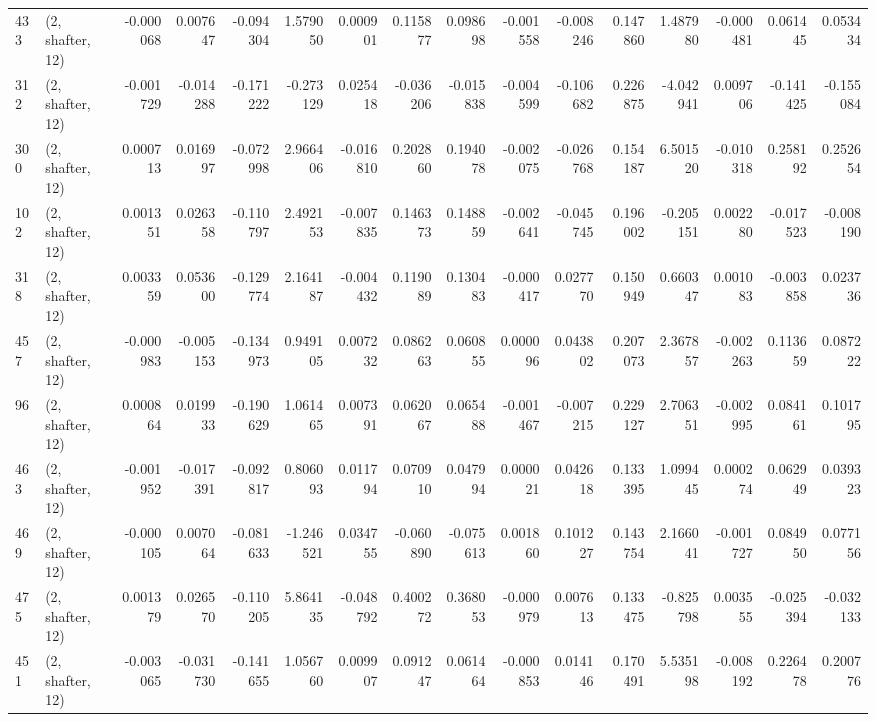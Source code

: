 \begin{tabular}{llrrrrrrrrrrrrrr}
433 &  (2, shafter, 12) &  -0.000068 &  0.007647 & -0.094304 &   1.579050 &  0.000901 &   0.115877 &  0.098698 & -0.001558 & -0.008246 &  0.147860 &     1.487980 &  -0.000481 &   0.061445 &   0.053434 \\
312 &  (2, shafter, 12) &  -0.001729 & -0.014288 & -0.171222 &  -0.273129 &  0.025418 &  -0.036206 & -0.015838 & -0.004599 & -0.106682 &  0.226875 &    -4.042941 &   0.009706 &  -0.141425 &  -0.155084 \\
300 &  (2, shafter, 12) &   0.000713 &  0.016997 & -0.072998 &   2.966406 & -0.016810 &   0.202860 &  0.194078 & -0.002075 & -0.026768 &  0.154187 &     6.501520 &  -0.010318 &   0.258192 &   0.252654 \\
102 &  (2, shafter, 12) &   0.001351 &  0.026358 & -0.110797 &   2.492153 & -0.007835 &   0.146373 &  0.148859 & -0.002641 & -0.045745 &  0.196002 &    -0.205151 &   0.002280 &  -0.017523 &  -0.008190 \\
318 &  (2, shafter, 12) &   0.003359 &  0.053600 & -0.129774 &   2.164187 & -0.004432 &   0.119089 &  0.130483 & -0.000417 &  0.027770 &  0.150949 &     0.660347 &   0.001083 &  -0.003858 &   0.023736 \\
457 &  (2, shafter, 12) &  -0.000983 & -0.005153 & -0.134973 &   0.949105 &  0.007232 &   0.086263 &  0.060855 &  0.000096 &  0.043802 &  0.207073 &     2.367857 &  -0.002263 &   0.113659 &   0.087222 \\
96  &  (2, shafter, 12) &   0.000864 &  0.019933 & -0.190629 &   1.061465 &  0.007391 &   0.062067 &  0.065488 & -0.001467 & -0.007215 &  0.229127 &     2.706351 &  -0.002995 &   0.084161 &   0.101795 \\
463 &  (2, shafter, 12) &  -0.001952 & -0.017391 & -0.092817 &   0.806093 &  0.011794 &   0.070910 &  0.047994 &  0.000021 &  0.042618 &  0.133395 &     1.099445 &   0.000274 &   0.062949 &   0.039323 \\
469 &  (2, shafter, 12) &  -0.000105 &  0.007064 & -0.081633 &  -1.246521 &  0.034755 &  -0.060890 & -0.075613 &  0.001860 &  0.101227 &  0.143754 &     2.166041 &  -0.001727 &   0.084950 &   0.077156 \\
475 &  (2, shafter, 12) &   0.001379 &  0.026570 & -0.110205 &   5.864135 & -0.048792 &   0.400272 &  0.368053 & -0.000979 &  0.007613 &  0.133475 &    -0.825798 &   0.003555 &  -0.025394 &  -0.032133 \\
451 &  (2, shafter, 12) &  -0.003065 & -0.031730 & -0.141655 &   1.056760 &  0.009907 &   0.091247 &  0.061464 & -0.000853 &  0.014146 &  0.170491 &     5.535198 &  -0.008192 &   0.226478 &   0.200776 \\

\end{tabular}
